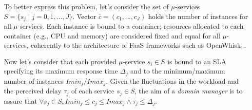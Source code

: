 



To better express this problem, let's consider the set of $\mu$-services $S = \{s_j \mid j = 0,1,...,J\}$.
Vector $\bar{c} = (c_1, ..., c_J)$ holds the number of instances for all $\mu$-services. Each instance is bound to a container; resources allocated to each container 
(e.g., CPU and memory) are considered fixed and equal for all $\mu$-services, coherently to the architecture of FaaS frameworks such as OpenWhisk~\cite{OpenWhisk}.

Now let's consider that each provided $\mu$-service $s_i \in S$ is bound to an SLA specifying its maximum response time $\Delta_j$ and to the minimum/maximum number of instances $Imin_{j}/Imax_{j}$. %
Given the fluctuations in the workload and the perceived delay $\tau_j$ of each service $s_j \in S$, the aim of a \textit{domain manager} is to assure that $\forall s_j \in S, Imin_j \le c_j \le Imax_j \wedge \tau_j \le \Delta_j$. 





